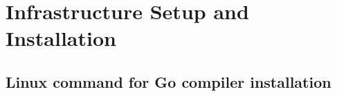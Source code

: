 \chapter{Infrastructure Setup and Installation} 

\label{AppendixA} 



\section{Linux command for Go compiler installation}
\lstset{basicstyle=\ttfamily\tiny} 
